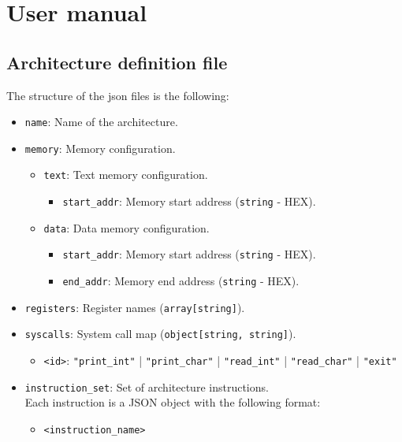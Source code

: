 \chapter{User manual}\label{app:manual}

\section{Architecture definition file}
The structure of the \gls{json} files is the following:
\begin{itemize}[nosep,noitemsep]
  \item \texttt{name}: Name of the architecture.
  \item \texttt{memory}: Memory configuration.
    \begin{itemize}[nosep,noitemsep]
      \item \texttt{text}: Text memory configuration.
        \begin{itemize}[nosep,noitemsep]
          \item \texttt{start\_addr}: Memory start address (\texttt{string} - HEX).
        \end{itemize}
      \item \texttt{data}: Data memory configuration.
        \begin{itemize}[nosep,noitemsep]
          \item \texttt{start\_addr}: Memory start address (\texttt{string} - HEX).
          \item \texttt{end\_addr}: Memory end address (\texttt{string} - HEX).
        \end{itemize}
    \end{itemize}
  \item \texttt{registers}: Register names (\texttt{array[string]}).
  \item \texttt{syscalls}: System call map (\texttt{object[string, string]}).
    \begin{itemize}[nosep,noitemsep]
      \item \texttt{<id>}: \texttt{"print\_int"} | \texttt{"print\_char"} | \texttt{"read\_int"} | \texttt{"read\_char"} | \texttt{"exit"}
    \end{itemize}
  \item \texttt{instruction\_set}: Set of architecture instructions.\\
    Each instruction is a JSON object with the following format:
    \begin{itemize}[nosep,noitemsep]
      \item \texttt{<instruction\_name>}

\end{itemize}
\end{itemize}
